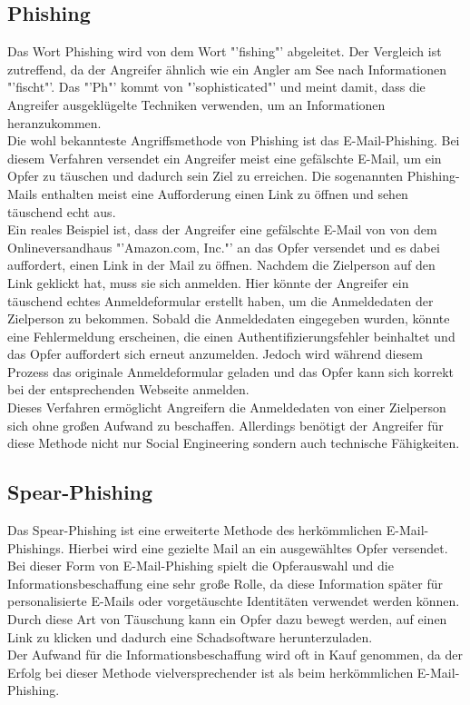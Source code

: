 		\subsection{Phishing}
		Das Wort Phishing wird von dem Wort "'fishing"' abgeleitet. Der Vergleich ist zutreffend, da der Angreifer ähnlich wie ein Angler am See nach Informationen "'fischt"'. Das "'Ph"' kommt von "'sophisticated"' und meint damit, dass die Angreifer ausgeklügelte Techniken verwenden, um an Informationen heranzukommen.\cite{PhishingExposed}\\
		Die wohl bekannteste Angriffsmethode von Phishing ist das E-Mail-Phishing. Bei diesem Verfahren versendet ein Angreifer meist eine gefälschte E-Mail, um ein Opfer zu täuschen und dadurch sein Ziel zu erreichen. Die sogenannten Phishing-Mails enthalten meist eine Aufforderung einen Link zu öffnen und sehen täuschend echt aus.\\
		Ein reales Beispiel ist, dass der Angreifer eine gefälschte E-Mail von von dem Onlineversandhaus "'Amazon.com, Inc."' an das Opfer versendet und es dabei auffordert, einen Link in der Mail zu öffnen. Nachdem die Zielperson auf den Link geklickt hat, muss sie sich anmelden. Hier könnte der Angreifer ein täuschend echtes Anmeldeformular erstellt haben, um die Anmeldedaten der Zielperson zu bekommen. Sobald die Anmeldedaten eingegeben wurden, könnte eine Fehlermeldung erscheinen, die einen Authentifizierungsfehler beinhaltet und das Opfer auffordert sich erneut anzumelden. Jedoch wird während diesem Prozess das originale Anmeldeformular geladen und das Opfer kann sich korrekt bei der entsprechenden Webseite anmelden. \\
		Dieses Verfahren ermöglicht Angreifern die Anmeldedaten von einer Zielperson sich ohne großen Aufwand zu beschaffen. Allerdings benötigt der Angreifer für diese Methode nicht nur Social Engineering sondern auch technische Fähigkeiten.\cite{PhishingDarkWaters}
		
		\subsection{Spear-Phishing}
		Das Spear-Phishing ist eine erweiterte Methode des herkömmlichen E-Mail-Phishings. Hierbei wird eine gezielte Mail an ein ausgewähltes Opfer versendet.\cite{SpearPhishingPaper}\\
		Bei dieser Form von E-Mail-Phishing spielt die Opferauswahl und die Informationsbeschaffung eine sehr große Rolle, da diese Information später für personalisierte E-Mails oder vorgetäuschte Identitäten verwendet werden können. Durch diese Art von Täuschung kann ein Opfer dazu bewegt werden, auf einen Link zu klicken und dadurch eine Schadsoftware herunterzuladen.\cite{SpearPhishingPaper} \\
		Der Aufwand für die Informationsbeschaffung wird oft in Kauf genommen, da der Erfolg bei dieser Methode vielversprechender ist als beim herkömmlichen E-Mail-Phishing.


